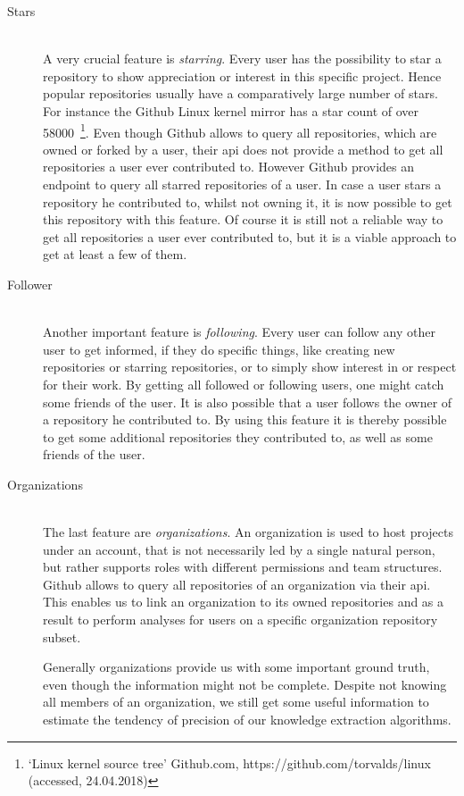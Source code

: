\begin{description}
    \item[Stars] \hfill \\
        A very crucial feature is \emph{starring}. Every user has the possibility to star a repository to show appreciation or interest in this specific project.
        Hence popular repositories usually have a comparatively large number of stars. For instance the Github Linux kernel mirror has a star count of over 58000~\footnote{`Linux kernel source tree' Github.com, https://github.com/torvalds/linux (accessed, 24.04.2018)}.
        Even though Github allows to query all repositories, which are owned or forked by a user, their \ac{api} does not provide a method to get all repositories a user ever contributed to.
        However Github provides an endpoint to query all starred repositories of a user.
        In case a user stars a repository he contributed to, whilst not owning it, it is now possible to get this repository with this feature.
        Of course it is still not a reliable way to get all repositories a user ever contributed to, but it is a viable approach to get at least a few of them.

    \item[Follower] \hfill \\
        Another important feature is \emph{following}.
        Every user can follow any other user to get informed, if they do specific things, like creating new repositories or starring repositories, or to simply show interest in or respect for their work.
        By getting all followed or following users, one might catch some friends of the user.
        It is also possible that a user follows the owner of a repository he contributed to.
        By using this feature it is thereby possible to get some additional repositories they contributed to, as well as some friends of the user.

    \item[Organizations] \hfill \\
        The last feature are \emph{organizations}.
        An organization is used to host projects under an account, that is not necessarily led by a single natural person, but rather supports roles with different permissions and team structures.
        Github allows to query all repositories of an organization via their \ac{api}.
        This enables us to link an organization to its owned repositories and as a result to perform analyses for users on a specific organization repository subset.

        Generally organizations provide us with some important ground truth, even though the information might not be complete.
        Despite not knowing all members of an organization, we still get some useful information to estimate the tendency of precision of our knowledge extraction algorithms.
\end{description}
